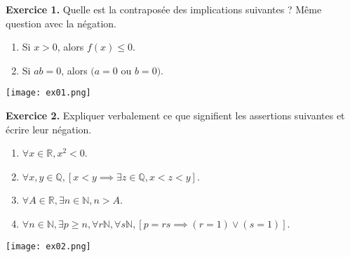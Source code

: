 \documentclass[a4paper, 10pt]{report}
\begin{document}
	
	\renewcommand{\headrule}{
		\color{lightgray} \par\noindent\rule{\textwidth}{2pt}
	}	
	\pagestyle{fancy}
	\fancyhf{}
	
	
	\vspace{5mm}
	\noindent
	\textbf{Exercice 1.} Quelle est la contraposée des implications
	suivantes ? Même question avec la négation.
	\begin{enumerate}[label=(\roman*)]
		\item Si $x > 0$, alors $f(x) \leq 0$.
		\item Si $ab = 0$, alors $(a = 0$ ou $b = 0)$.
	\end{enumerate}
	
	\texttt{[image: ex01.png]}
	
	\vspace{5mm}
	\noindent
	\textbf{Exercice 2.} Expliquer verbalement ce que signifient les
	assertions suivantes et écrire leur négation.
	\begin{enumerate}[label=(\roman*)]
		\item $\forall x \in \mathbb{R}, x^2 < 0$.
		\item $\forall x,y \in \mathbb{Q}, [x < y \implies
			\exists z \in \mathbb{Q}, x < z < y]$.
		\item $\forall A \in \mathbb{R}, \exists n \in \mathbb{N},
			n > A$.
		\item $\forall n \in \mathbb{N}, \exists p \geq n,
			\forall r \mathbb{N}, \forall s \mathbb{N},
			[p = rs \implies (r = 1) \lor (s = 1)]$.
	\end{enumerate}
	
	\texttt{[image: ex02.png]}
	
\end{document}

